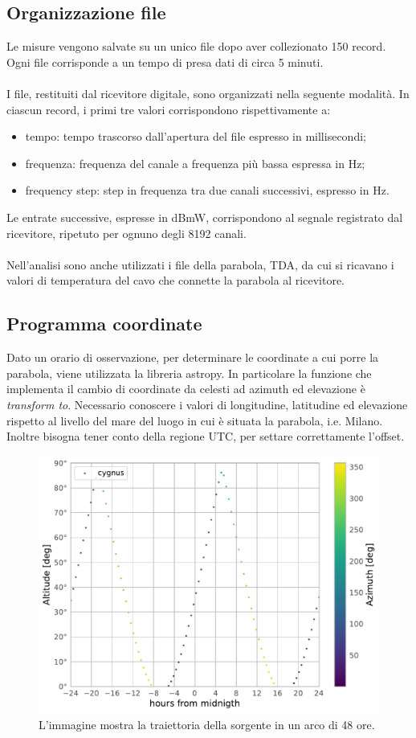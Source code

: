 \subsection{Organizzazione file}
Le misure vengono salvate su un unico file dopo aver collezionato 150 record. Ogni file corrisponde a un tempo di presa dati di circa 5 minuti.
\\\\
I file, restituiti dal ricevitore digitale, sono organizzati nella seguente modalità. In ciascun record, i primi tre valori corrispondono rispettivamente a:
\begin{itemize}
\item tempo: tempo trascorso dall'apertura del file espresso in millisecondi;
\item frequenza: frequenza del canale a frequenza più bassa espressa in Hz;
\item frequency step: step in frequenza tra due canali successivi, espresso in Hz.
\end{itemize}
Le entrate successive, espresse in dBmW, corrispondono al segnale registrato dal ricevitore, ripetuto per ognuno degli 8192 canali.
\\\\
Nell'analisi sono anche utilizzati i file della parabola, TDA, da cui si ricavano i valori di temperatura del cavo che connette la parabola al ricevitore. %


\subsection{Programma coordinate}
\label{Programma coordinate}
Dato un orario di osservazione, per determinare le coordinate a cui porre la parabola, viene utilizzata la libreria astropy. In particolare la funzione che implementa il cambio di coordinate da celesti ad azimuth ed elevazione è \textit{transform to}.  Necessario conoscere i valori di longitudine, latitudine ed elevazione rispetto al livello del mare del luogo in cui è situata la parabola, i.e. Milano. Inoltre bisogna tener conto della regione UTC, per settare correttamente l'offset. 

\begin{figure}[h]
\includegraphics[scale=0.60]{Coordinate.pdf}
\centering
\caption{L'immagine mostra la traiettoria della sorgente in un arco di 48 ore.}
\label{fig:Coordinate}
\end{figure}
